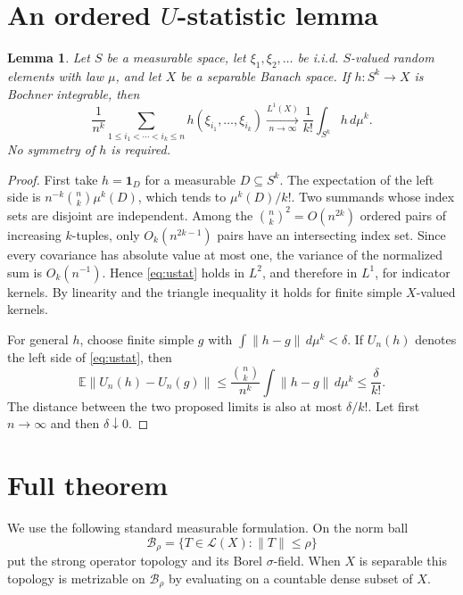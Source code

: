 \documentclass[11pt]{article}
\newtheorem{lemma}[theorem]{Lemma}
\newcommand{\E}{\mathbb E}
\newcommand{\Lcal}{\mathcal L}
\begin{document}
\section{An ordered $U$-statistic lemma}

\begin{lemma}\label{lem:ustat}
Let $S$ be a measurable space, let $\xi_1,\xi_2,\ldots$ be i.i.d.
$S$-valued random elements with law $\mu$, and let $X$ be a separable Banach
space.  If $h:S^k\to X$ is Bochner integrable, then
\begin{equation}\label{eq:ustat}
 \frac1{n^k}\sum_{1\leq i_1<\cdots<i_k\leq n}
 h(\xi_{i_1},\ldots,\xi_{i_k})
 \xrightarrow[n\to\infty]{L^1(X)}
 \frac1{k!}\int_{S^k}h\,d\mu^k.
\end{equation}
No symmetry of $h$ is required.
\end{lemma}

\begin{proof}
First take $h=\mathbf1_D$ for a measurable $D\subseteq S^k$.  The
expectation of the left side is
$n^{-k}\binom nk\mu^k(D)$, which tends to $\mu^k(D)/k!$.  Two summands
whose index sets are disjoint are independent.  Among the
$\binom nk^2=O(n^{2k})$ ordered pairs of increasing $k$-tuples, only
$O_k(n^{2k-1})$ pairs have an intersecting index set.  Since every covariance
has absolute value at most one, the variance of the normalized sum is
$O_k(n^{-1})$.  Hence \eqref{eq:ustat} holds in $L^2$, and therefore in
$L^1$, for indicator kernels.  By linearity and the triangle inequality it
holds for finite simple $X$-valued kernels.

For general $h$, choose finite simple $g$ with
$\int\|h-g\|\,d\mu^k<\delta$.  If $U_n(h)$ denotes the left side of
\eqref{eq:ustat}, then
\[
 \E\|U_n(h)-U_n(g)\|
 \leq \frac{\binom nk}{n^k}\int\|h-g\|\,d\mu^k
 \leq\frac{\delta}{k!}.
\]
The distance between the two proposed limits is also at most $\delta/k!$.
Let first $n\to\infty$ and then $\delta\downarrow0$.
\end{proof}

\section{Full theorem}

We use the following standard measurable formulation.  On the norm ball
\[
 \mathcal B_\rho=\{T\in\Lcal(X):\|T\|\leq\rho\}
\]
put the strong operator topology and its Borel $\sigma$-field.  When $X$ is
separable this topology is metrizable on $\mathcal B_\rho$ by evaluating on
a countable dense subset of $X$.
\end{document}
